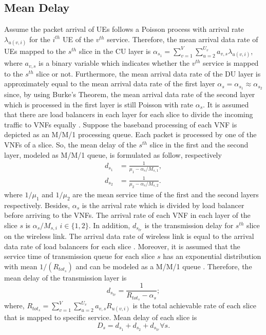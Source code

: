 \documentclass[conference]{IEEEtran}
\begin{document}
\subsection{Mean Delay}
Assume the packet arrival of UEs follows  a Poisson process with arrival rate $\lambda_{u(v,i)}$ for the $i^{th}$ UE of the $v^{th}$ service.
Therefore, the mean arrival data rate of UEs mapped to the $s^{th}$ slice in the CU layer is $\alpha_{s_1} = \sum_{v=1}^{V}\sum_{u=2}^{U_v}a_{v,s}\lambda_{u(v,i)}$, where $a_{v,s}$ is a binary variable which indicates whether the $v^{th}$ service is mapped to the $s^{th}$ slice or not.
Furthermore, the mean arrival data rate of the DU layer is approximately equal to the mean arrival data rate of the first layer $\alpha_{s} =\alpha_{s_1} \approx \alpha_{s_2}$ since, by using Burke’s Theorem, the mean arrival data rate of the second layer which is processed in the first layer is still Poisson with rate $\alpha_{s}$.
It is assumed that there are load balancers in each layer for each slice to divide the incoming traffic to VNFs equally \cite{frdl,luong2018novel,luong2018novel1}.
Suppose the baseband processing of each VNF is depicted as an M/M/1 processing queue.
Each packet is processed by one of the VNFs of a slice. So, the mean delay of the $s^{th}$ slice in the first and the second layer, modeled as M/M/1 queue, is formulated as follow, respectively
\begin{equation}
\begin{split}
d_{s_1} &= \frac{1}{\mu_1 - \alpha_{s}/{M_{s,1}}},\\
d_{s_2} &= \frac{1}{\mu_2 - \alpha_{s}/{M_{s,2}}}.
\end{split}
\end{equation}
where $1/\mu_1$ and $1/\mu_2$ are the mean service time of the first and the second layers respectively.
Besides, $\alpha_{s}$ is the  arrival rate which is divided
by load balancer before arriving to the VNFs. The  arrival rate of each VNF in each layer of the slice $s$ is $\alpha_{s}/{M_{s,i}}$ $ i \in \{1,2\}$.
In addition, $d_{s_{tr}}$ is the transmission delay for $s^{th}$ slice on the  wireless link. The arrival data rate of wireless link
 is equal to the arrival data rate of load balancers for each slice \cite{frdl}.
Moreover, it is assumed that the service time of transmission queue for each slice $s$ has
 an exponential distribution with mean $1/(R_{{tot}_s})$ and can be modeled as a M/M/1 queue \cite{frdl,luong2018novel,luong2018novel1,guo2016exploiting}. Therefore,
the mean delay of the transmission layer is
\begin{equation}
 d_{s_{tr}} = \frac{1}{R_{{tot}_s} - \alpha_{s}};
\end{equation}
where, $R_{{tot}_s} =  \sum_{v=1}^{V}\sum_{u=2}^{U_v}a_{v,s}R_{u(v,i)}$ is the total achievable rate of each slice that is mapped to specific service.
Mean delay of each slice is
\begin{equation}
D_{s} = d_{s_1} + d_{s_2} + d_{s_{tr}} \forall s.
\end{equation}
\end{document}
